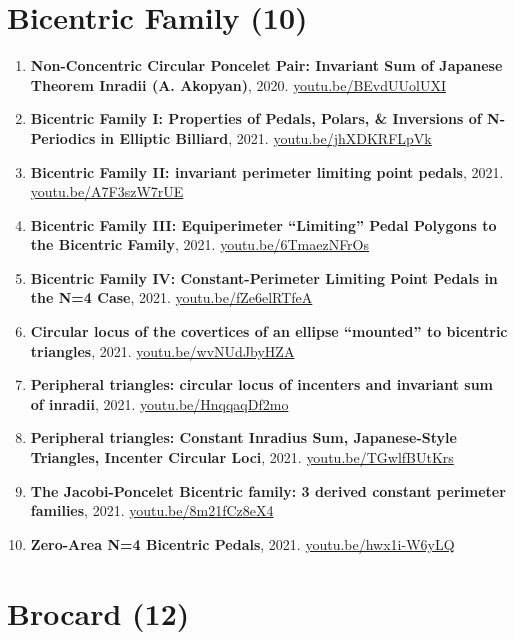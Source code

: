 \documentclass[12pt]{article}
\begin{document}
\section{Bicentric Family (10)}

\begin{enumerate}[resume]
\item \textbf{Non-Concentric Circular Poncelet Pair: Invariant Sum of Japanese Theorem Inradii (A. Akopyan)}, 2020. \href{https://youtu.be/BEvdUUolUXI}{\url{youtu.be/BEvdUUolUXI}}
\item \textbf{Bicentric Family I: Properties of Pedals, Polars, \& Inversions of N-Periodics in Elliptic Billiard}, 2021. \href{https://youtu.be/jhXDKRFLpVk}{\url{youtu.be/jhXDKRFLpVk}}
\item \textbf{Bicentric Family II: invariant perimeter limiting point pedals}, 2021. \href{https://youtu.be/A7F3szW7rUE}{\url{youtu.be/A7F3szW7rUE}}
\item \textbf{Bicentric Family III: Equiperimeter ``Limiting'' Pedal Polygons to the Bicentric Family}, 2021. \href{https://youtu.be/6TmaezNFrOs}{\url{youtu.be/6TmaezNFrOs}}
\item \textbf{Bicentric Family IV: Constant-Perimeter Limiting Point Pedals in the N=4 Case}, 2021. \href{https://youtu.be/fZe6elRTfeA}{\url{youtu.be/fZe6elRTfeA}}
\item \textbf{Circular locus of the covertices of an ellipse ``mounted'' to bicentric triangles}, 2021. \href{https://youtu.be/wvNUdJbyHZA}{\url{youtu.be/wvNUdJbyHZA}}
\item \textbf{Peripheral triangles: circular locus of incenters and invariant sum of inradii}, 2021. \href{https://youtu.be/HnqqaqDf2mo}{\url{youtu.be/HnqqaqDf2mo}}
\item \textbf{Peripheral triangles: Constant Inradius Sum, Japanese-Style Triangles, Incenter Circular Loci}, 2021. \href{https://youtu.be/TGwlfBUtKrs}{\url{youtu.be/TGwlfBUtKrs}}
\item \textbf{The Jacobi-Poncelet Bicentric family: 3 derived constant perimeter families}, 2021. \href{https://youtu.be/8m21fCz8eX4}{\url{youtu.be/8m21fCz8eX4}}
\item \textbf{Zero-Area N=4 Bicentric Pedals}, 2021. \href{https://youtu.be/hwx1i-W6yLQ}{\url{youtu.be/hwx1i-W6yLQ}}
\end{enumerate}

\section{Brocard (12)}
\end{document}

